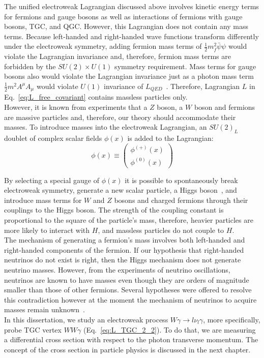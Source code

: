The unified electroweak Lagrangian discussed above involves kinetic energy terms for fermions and gauge bosons as well as interactions of fermions with gauge bosons, TGC, and QGC. However, this Lagrangian does not contain any mass terms. Because left-handed and right-handed wave functions transform differently under the electroweak symmetry, adding fermion mass terms of $\frac{1}{2} m_f^2 \bar{\psi} \psi$ would violate the Lagrangian invariance and, therefore, fermion mass terms are forbidden by the $SU(2) \times U(1)$ symmetry requirement. Mass terms for gauge bosons also would violate the Lagrangian invariance just as a photon mass term $\frac{1}{2} m^2 A^\mu A_\mu$ would violate $U(1)$ invariance of $L_{QED}$~\cite{ref_Griffiths}. Therefore, Lagrangian $L$ in Eq.~\ref{eq:L_free_covariant} contains massless particles only.\\

However, it is known from experiments that a $Z$ boson, a $W$ boson and fermions are massive particles and, therefore, our theory should accommodate their masses. To introduce masses into the electroweak Lagrangian, an $SU(2)_L$ doublet of complex scalar fields $\phi(x)$ is added to the Lagrangian:\\

\begin{equation}\label{eq:H_doublet}
  \phi(x) \equiv \begin{pmatrix} \phi^{(+)}(x) \\ \phi^{(0)}(x) \end{pmatrix}
\end{equation}

By selecting a special gauge of $\phi(x)$ it is possible to spontaneously break electroweak symmetry, generate a new scalar particle, a Higgs boson~\cite{ref_Pich}, and introduce mass terms for $W$ and $Z$ bosons and charged fermions through their couplings to the Higgs boson. The strength of the coupling constant is proportional to the square of the particle's mass, therefore, heavier particles are more likely to interact with $H$, and massless particles do not couple to $H$.\\

The mechanism of generating a fermion's mass involves both left-handed and right-handed components of the fermion. If our hypothesis that right-handed neutrinos do not exist is right, then the Higgs mechanism does not generate neutrino masses. However, from the experiments of neutrino oscillations, neutrinos are known to have masses even though they are orders of magnitude smaller than those of other fermions. Several hypotheses were offered to resolve this contradiction however at the moment the mechanism of neutrinos to acquire masses remain unknown~\cite{ref_PDG}.\\

In this dissertation, we study an electroweak process $W\gamma \rightarrow l \nu_l \gamma$, more specifically, probe TGC vertex $WW\gamma$ (Eq.~\ref{eq:L_TGC_2_2}). To do that, we are measuring a differential cross section with respect to the photon transverse momentum. The concept of the cross section in particle physics is discussed in the next chapter.\\

